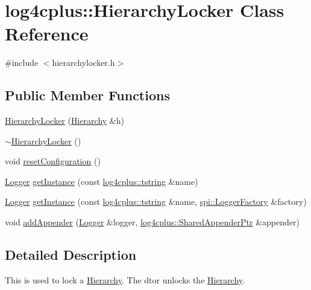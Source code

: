 \hypertarget{classlog4cplus_1_1HierarchyLocker}{\section{log4cplus\-:\-:Hierarchy\-Locker Class Reference}
\label{classlog4cplus_1_1HierarchyLocker}
}


{\ttfamily \#include $<$hierarchylocker.\-h$>$}

\subsection*{Public Member Functions}
\begin{DoxyCompactItemize}
\item 
\hyperlink{classlog4cplus_1_1HierarchyLocker_a459a06f4edb6e72611c957300329c3b5}{Hierarchy\-Locker} (\hyperlink{classlog4cplus_1_1Hierarchy}{Hierarchy} \&h)
\item 
\hyperlink{classlog4cplus_1_1HierarchyLocker_aeaa3d769d497ad444b7c0c4e7a7c1e05}{$\sim$\-Hierarchy\-Locker} ()
\item 
void \hyperlink{classlog4cplus_1_1HierarchyLocker_a1fa66bf5724ca6301b8a44423b62a9eb}{reset\-Configuration} ()
\item 
\hyperlink{classlog4cplus_1_1Logger}{Logger} \hyperlink{classlog4cplus_1_1HierarchyLocker_a2ef818667eb75a4f32cc1df37a594ab4}{get\-Instance} (const \hyperlink{namespacelog4cplus_a3c9287f6ebcddc50355e29d71152117b}{log4cplus\-::tstring} \&name)
\item 
\hyperlink{classlog4cplus_1_1Logger}{Logger} \hyperlink{classlog4cplus_1_1HierarchyLocker_a9a0f82b80a4f07147bedc05f55b06d45}{get\-Instance} (const \hyperlink{namespacelog4cplus_a3c9287f6ebcddc50355e29d71152117b}{log4cplus\-::tstring} \&name, \hyperlink{classlog4cplus_1_1spi_1_1LoggerFactory}{spi\-::\-Logger\-Factory} \&factory)
\item 
void \hyperlink{classlog4cplus_1_1HierarchyLocker_a4d3e3a53d953695b17344b5b6b4bd306}{add\-Appender} (\hyperlink{classlog4cplus_1_1Logger}{Logger} \&logger, \hyperlink{namespacelog4cplus_a12d841b842c72396be9219ce67a0c215}{log4cplus\-::\-Shared\-Appender\-Ptr} \&appender)
\end{DoxyCompactItemize}


\subsection{Detailed Description}
This is used to lock a \hyperlink{classlog4cplus_1_1Hierarchy}{Hierarchy}. The dtor unlocks the \hyperlink{classlog4cplus_1_1Hierarchy}{Hierarchy}. 

